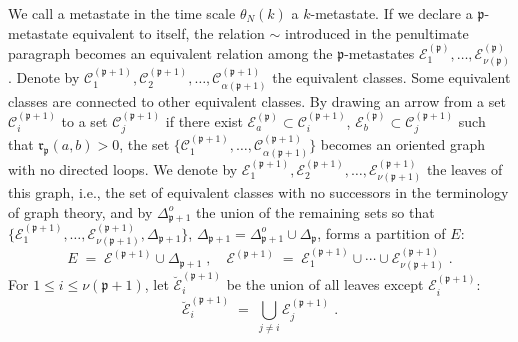 \documentclass[reqno]{amsart}
\begin{document}
We call a metastate in the time scale $\theta_N(k)$ a $k$-metastate.
If we declare a ${{\mathfrak p}}$-metastate equivalent to itself, the relation
$\sim$ introduced in the penultimate paragraph becomes an equivalent
relation among the ${{\mathfrak p}}$-metastates ${{\mathcal E}}^{({{\mathfrak p}})}_1, \dots, {{\mathcal E}}^{({{\mathfrak p}})}_{\nu ({{\mathfrak p}})}$. Denote by ${{\mathcal C}}^{({{\mathfrak p}} +1)}_1, {{\mathcal C}}^{({{\mathfrak p}} +1)}_2, \dots, {{\mathcal C}}^{({{\mathfrak p}} +1)}_{\alpha({{\mathfrak p}} +1)}$ the
equivalent classes.  Some equivalent classes are connected to other
equivalent classes. By drawing an arrow from a set ${{\mathcal C}}^{({{\mathfrak p}}
  +1)}_i$ to a set ${{\mathcal C}}^{({{\mathfrak p}} +1)}_j$ if there exist ${{\mathcal E}}^{({{\mathfrak p}})}_a \subset {{\mathcal C}}^{({{\mathfrak p}} +1)}_i$, ${{\mathcal E}}^{({{\mathfrak p}})}_b \subset {{\mathcal C}}^{({{\mathfrak p}} +1)}_j$ such that ${{\mathfrak r}}_{{{\mathfrak p}}}(a,b)>0$, the set $\{{{\mathcal C}}^{({{\mathfrak p}} +1)}_1, \dots, {{\mathcal C}}^{({{\mathfrak p}} +1)}_{\alpha ({{\mathfrak p}} +1)}\}$
becomes an oriented graph with no directed loops. We denote by ${{\mathcal E}}^{({{\mathfrak p}} +1)}_1, {{\mathcal E}}^{({{\mathfrak p}} +1)}_2, \dots, {{\mathcal E}}^{({{\mathfrak p}} +1)}_{\nu
  ({{\mathfrak p}}+1)}$ the leaves of this graph, i.e., the set of equivalent
classes with no successors in the terminology of graph theory, and by
$\Delta^o_{{{\mathfrak p}}+1}$ the union of the remaining sets so that $\{{{\mathcal E}}^{({{\mathfrak p}} +1)}_1, \dots, {{\mathcal E}}^{({{\mathfrak p}} +1)}_{\nu ({{\mathfrak p}}+1)},
\Delta_{{{\mathfrak p}} +1}\}$, $\Delta_{{{\mathfrak p}} +1} = \Delta^o_{{{\mathfrak p}}+1} \cup
\Delta_{{{\mathfrak p}}}$, forms a partition of $E$:
\begin{equation*}
E \;=\; {{\mathcal E}}^{({{\mathfrak p}} +1)} \cup \Delta_{{{\mathfrak p}} +1} \;, \quad
{{\mathcal E}}^{({{\mathfrak p}} +1)} \;=\; {{\mathcal E}}^{({{\mathfrak p}} +1)}_1 \cup  \cdots \cup 
{{\mathcal E}}^{({{\mathfrak p}} +1)}_{\nu({{\mathfrak p}}+1)} \; .
\end{equation*}
For $1\le i\le \nu ({{\mathfrak p}}+1)$, let $\breve{{{\mathcal E}}}^{({{\mathfrak p}} +1)}_i$ be
the union of all leaves except ${{\mathcal E}}^{({{\mathfrak p}} +1)}_i$:
\begin{equation*}
\breve{{{\mathcal E}}}^{({{\mathfrak p}} +1)}_i \;=\; \bigcup_{j\not = i} {{\mathcal E}}^{({{\mathfrak p}} +1)}_j\;.
\end{equation*}
\end{document}
